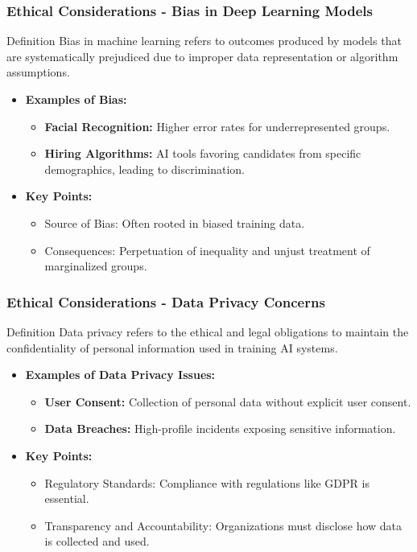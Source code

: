 \documentclass[aspectratio=169]{beamer}
\begin{document}
\begin{frame}[fragile]
  \frametitle{Ethical Considerations - Bias in Deep Learning Models}
  \begin{block}{Definition}
      Bias in machine learning refers to outcomes produced by models that are systematically prejudiced due to improper data representation or algorithm assumptions.
  \end{block}

  \begin{itemize}
      \item \textbf{Examples of Bias:}
      \begin{itemize}
          \item \textbf{Facial Recognition:} Higher error rates for underrepresented groups.
          \item \textbf{Hiring Algorithms:} AI tools favoring candidates from specific demographics, leading to discrimination.
      \end{itemize}
      
      \item \textbf{Key Points:}
      \begin{itemize}
          \item Source of Bias: Often rooted in biased training data.
          \item Consequences: Perpetuation of inequality and unjust treatment of marginalized groups.
      \end{itemize}
  \end{itemize}
\end{frame}

\begin{frame}[fragile]
  \frametitle{Ethical Considerations - Data Privacy Concerns}
  \begin{block}{Definition}
      Data privacy refers to the ethical and legal obligations to maintain the confidentiality of personal information used in training AI systems.
  \end{block}

  \begin{itemize}
      \item \textbf{Examples of Data Privacy Issues:}
      \begin{itemize}
          \item \textbf{User Consent:} Collection of personal data without explicit user consent.
          \item \textbf{Data Breaches:} High-profile incidents exposing sensitive information.
      \end{itemize}
      
      \item \textbf{Key Points:}
      \begin{itemize}
          \item Regulatory Standards: Compliance with regulations like GDPR is essential.
          \item Transparency and Accountability: Organizations must disclose how data is collected and used.
      \end{itemize}
  \end{itemize}
\end{frame}
\end{document}
